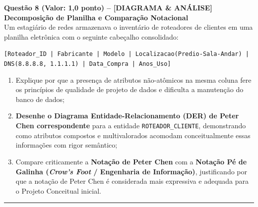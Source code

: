 \documentclass[11pt,a4paper]{article}
\begin{document}
\vspace{0.4cm}
\noindent\textbf{Questão 8 (Valor: 1,0 ponto) -- [DIAGRAMA \& ANÁLISE] Decomposição de Planilha e Comparação Notacional}\\[0.1cm]
Um estagiário de redes armazenava o inventário de roteadores de clientes em uma planilha eletrônica com o seguinte cabeçalho consolidado:\\
\centerline{\texttt{[Roteador\_ID | Fabricante | Modelo | Localizacao(Predio-Sala-Andar) | DNS(8.8.8.8, 1.1.1.1) | Data\_Compra | Anos\_Uso]}}
\begin{enumerate}[label=\alph*),itemsep=1pt]
  \item Explique por que a presença de atributos não-atômicos na mesma coluna fere os princípios de qualidade de projeto de dados e dificulta a manutenção do banco de dados;
  \item \textbf{Desenhe o Diagrama Entidade-Relacionamento (DER) de Peter Chen correspondente} para a entidade \texttt{ROTEADOR\_CLIENTE}, demonstrando como atributos compostos e multivalorados acomodam conceitualmente essas informações com rigor semântico;
  \item Compare criticamente a \textbf{Notação de Peter Chen} com a \textbf{Notação Pé de Galinha (\textit{Crow's Foot} / Engenharia de Informação)}, justificando por que a notação de Peter Chen é considerada mais expressiva e adequada para o Projeto Conceitual inicial.
\end{enumerate}

\vspace{0.4cm}
\hrule
\vspace{0.3cm}
\end{document}
